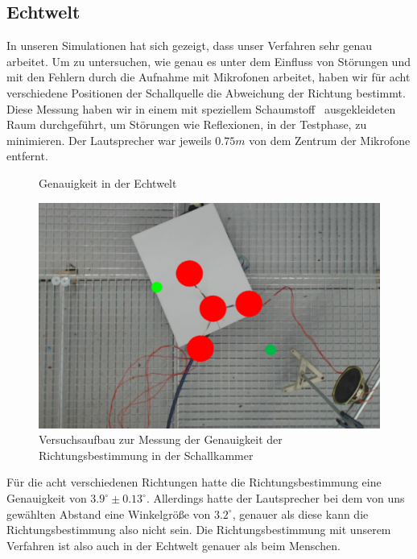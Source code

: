 \subsection{Echtwelt}
In unseren Simulationen hat sich gezeigt, dass unser Verfahren sehr genau arbeitet. Um zu untersuchen, wie genau es unter dem Einfluss von Störungen und mit den Fehlern durch die Aufnahme mit Mikrofonen arbeitet, haben wir für acht verschiedene Positionen der Schallquelle die Abweichung der Richtung bestimmt. Diese Messung haben wir in einem mit speziellem Schaumstoff~\cite{BASOTECT} ausgekleideten Raum durchgeführt, um Störungen wie Reflexionen, in der Testphase, zu minimieren. Der Lautsprecher war jeweils $0.75m$ von dem Zentrum der Mikrofone entfernt.\\
\begin{minipage}{0.49\linewidth}
\begin{figure}[H]
  \centering
  \resizebox{!}{0.7\textwidth}{}
  \caption{Genauigkeit in der Echtwelt}
  \label{fig:real}
\end{figure}
\end{minipage}\hfill{}%
\begin{minipage}{0.49\linewidth}
\begin{figure}[H]
  \centering
  \includegraphics[width=\textwidth]{img/pos_1}
  \caption{Versuchsaufbau zur Messung der Genauigkeit der Richtungsbestimmung in der Schallkammer}
  \label{fig:real_reral}
\end{figure}
\end{minipage}%
Für die acht verschiedenen Richtungen hatte die Richtungsbestimmung eine Genauigkeit von $3.9^\circ \pm 0.13^\circ$. Allerdings hatte der Lautsprecher bei dem von uns gewählten Abstand eine Winkelgröße von $3.2^\circ$, genauer als diese kann die Richtungsbestimmung also nicht sein. Die Richtungsbestimmung mit unserem Verfahren ist also auch in der Echtwelt genauer als beim Menschen.
